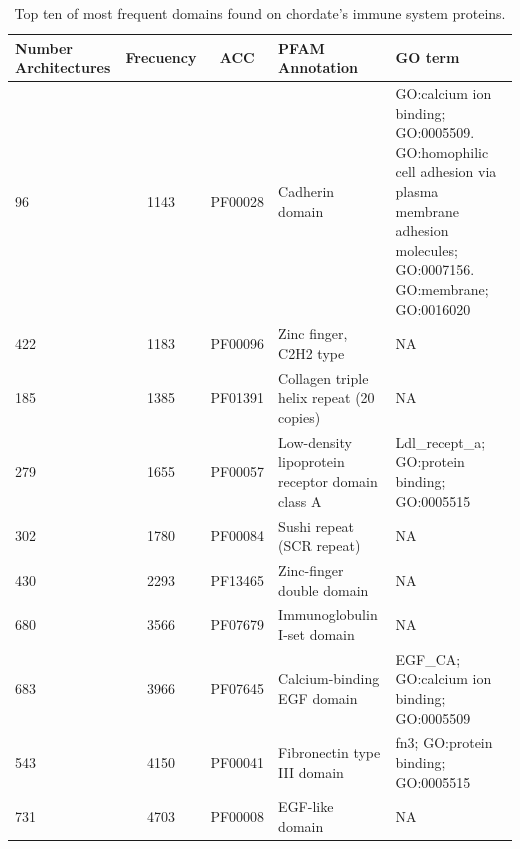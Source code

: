 \documentclass[11pt]{article}
\begin{document}
\begin{table}[ht!]
\caption{Top ten of most frequent domains found on chordate's immune system 
proteins.}
\begin{center}
\begin{tabular}{p{2.0cm}ccp{4cm}p{3.5cm}}
\toprule
\textbf{Number Architectures}& \textbf{Frecuency} & \textbf{ACC} & 
\textbf{PFAM Annotation} & \textbf{GO term}\\
\midrule
96&1143 & PF00028&Cadherin domain & GO:calcium ion binding; GO:0005509. 
GO:homophilic cell adhesion via plasma membrane adhesion molecules; GO:0007156. 
GO:membrane; GO:0016020\\
422&1183 & PF00096&Zinc finger, C2H2 type & NA \\
185&1385 &PF01391&Collagen triple helix repeat (20 copies) & NA \\
279&1655  &PF00057&Low-density lipoprotein receptor domain class A & 
Ldl\_recept\_a; GO:protein binding; GO:0005515 \\
302&1780 &PF00084&Sushi repeat (SCR repeat) & NA \\
430&2293 & PF13465&Zinc-finger double domain & NA\\
680&3566 &PF07679&Immunoglobulin I-set domain & NA\\
683&3966 &PF07645&Calcium-binding EGF domain & EGF\_CA; GO:calcium ion binding; 
GO:0005509\\
543&4150 &PF00041&Fibronectin type III domain & fn3; GO:protein binding; 
GO:0005515\\
731&4703 &PF00008&EGF-like domain & NA\\
\bottomrule
\end{tabular}
\end{center}
\label{tab:domains}
\end{table}%



\end{document}
